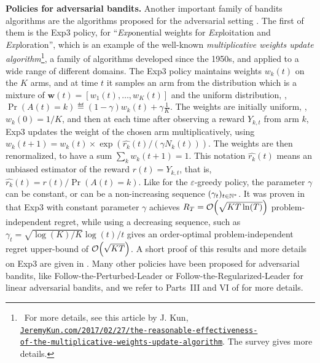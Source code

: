 \textbf{Policies for adversarial bandits.}
%
Another important family of bandits algorithms are the algorithms proposed for the adversarial setting \cite{Auer02NonStochastic}.
The first of them is the Exp3 policy, for ``\emph{Exp}onential weights for \emph{Exp}loitation and \emph{Exp}loration'',
which is an example of the well-known \emph{multiplicative weights update algorithm}\footnote{~For more details, see
this article by J. Kun, \href{https://jeremykun.com/2017/02/27/the-reasonable-effectiveness-of-the-multiplicative-weights-update-algorithm/}{\texttt{JeremyKun.com/2017/02/27/the-reasonable-effectiveness-}}\\
\href{https://jeremykun.com/2017/02/27/the-reasonable-effectiveness-of-the-multiplicative-weights-update-algorithm/}{\texttt{of-the-multiplicative-weights-update-algorithm}}. The survey \cite{Arora2012multiplicative} gives more details.},
a family of algorithms developed since the 1950s, and applied to a wide range of different domains.
%
The Exp3 policy maintains weights $w_k(t)$ on the $K$ arms, and at time $t$ it samples an arm from the distribution which is a mixture of $\bm{w}(t)=[w_1(t),\dots,w_K(t)]$ and the uniform distribution, \ie,
$\Pr(A(t)=k) \eqdef (1-\gamma) w_k(t) + \gamma \frac{1}{K}$.
The weights are initially uniform, \ie, $w_k(0)=1/K$, and then at each time after observing a reward $Y_{k,t}$ from arm $k$, Exp3 updates the weight of the chosen arm multiplicatively, using $w_k(t+1) = w_k(t) \times \exp(\widehat{r_k}(t) / (\gamma N_k(t)))$. The weights are then renormalized, to have a sum $\sum_k w_k(t+1) = 1$.
This notation $\widehat{r_k}(t)$ means an unbiased estimator of the reward $r(t)=Y_{k,t}$, that is, $\widehat{r_k}(t) = r(t) / \Pr(A(t)=k)$.
%
Like for the $\varepsilon$-greedy policy, the parameter $\gamma$ can be constant, or can be a non-increasing sequence $(\gamma_t)_{t\in\mathbb{N}^*}$.
%
It was proven in \cite{Auer02NonStochastic} that Exp3 with constant parameter $\gamma$ achieves $R_T = \mathop{}\mathopen{}\mathcal{O}\mathopen{}\left(\sqrt{K T \ln(T)}\right)$ problem-independent regret,
while using a decreasing sequence, such as $\gamma_t = \sqrt{\log(K) / K} \log(t) / t$ gives an order-optimal problem-independent regret upper-bound of $\mathop{}\mathopen{}\mathcal{O}\mathopen{}\left(\sqrt{K T}\right)$.
A short proof of this results and more details on Exp3 are given in \cite{Bubeck12}.
%
Many other policies have been proposed for adversarial bandits, like Follow-the-Perturbed-Leader or Follow-the-Regularized-Leader for linear adversarial bandits,
and we refer to Parts~III and VI of \cite{LattimoreBanditAlgorithmsBook} for more details.


